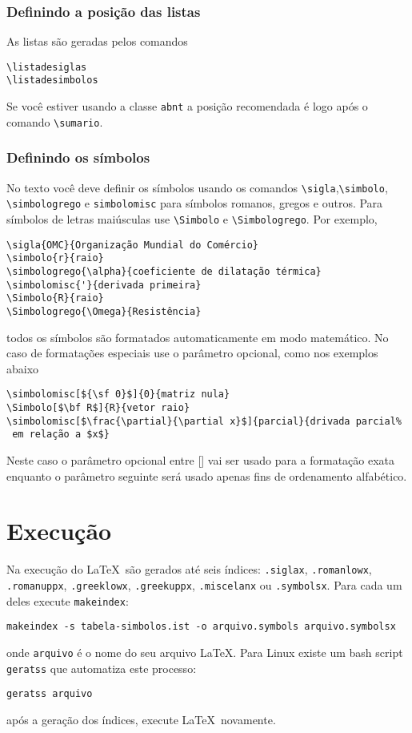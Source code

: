 \documentclass[espacosimples]{abnt}
\begin{document}
\subsubsection{Definindo a posição das listas}

As listas são geradas pelos comandos
\begin{verbatim}
\listadesiglas
\listadesimbolos
\end{verbatim}
Se você estiver usando a classe {\tt abnt}\cite{abnt-classe-doc} a posição recomendada é logo
após o comando \verb+\sumario+.

\subsubsection{Definindo os símbolos}

No texto você deve definir os símbolos usando os comandos \verb+\sigla+,\verb+\simbolo+,
\verb+\simbologrego+ e \verb+simbolomisc+ para símbolos romanos, gregos e outros.
Para símbolos de letras maiúsculas use \verb+\Simbolo+ e \verb+\Simbologrego+.
Por exemplo,
\begin{verbatim}
\sigla{OMC}{Organização Mundial do Comércio}
\simbolo{r}{raio}
\simbologrego{\alpha}{coeficiente de dilatação térmica}
\simbolomisc{'}{derivada primeira}
\Simbolo{R}{raio}
\Simbologrego{\Omega}{Resistência}
\end{verbatim}
todos os símbolos são formatados automaticamente em modo matemático.
No caso de formatações especiais use o parâmetro opcional, como nos
exemplos abaixo
\begin{verbatim}
\simbolomisc[${\sf 0}$]{0}{matriz nula}
\Simbolo[$\bf R$]{R}{vetor raio}
\simbolomisc[$\frac{\partial}{\partial x}$]{parcial}{drivada parcial%
 em relação a $x$}
\end{verbatim}
Neste caso o parâmetro opcional entre [] vai ser usado para a formatação exata
enquanto o parâmetro seguinte será usado apenas fins de ordenamento alfabético.

\section{Execução}

Na execução do \LaTeX\ são gerados até seis índices: {\tt .siglax},
{\tt .romanlowx}, {\tt .romanuppx}, {\tt .greeklowx}, {\tt .greekuppx},
{\tt .miscelanx} ou {\tt .symbolsx}. 
Para cada um deles execute {\tt makeindex}:
\begin{verbatim}
makeindex -s tabela-simbolos.ist -o arquivo.symbols arquivo.symbolsx
\end{verbatim}
onde {\tt arquivo} é o nome do seu arquivo \LaTeX.
Para Linux existe um bash script {\tt geratss} que automatiza este processo:
\begin{verbatim}
geratss arquivo
\end{verbatim}
após a geração dos índices, execute \LaTeX\ novamente.
\end{document}
